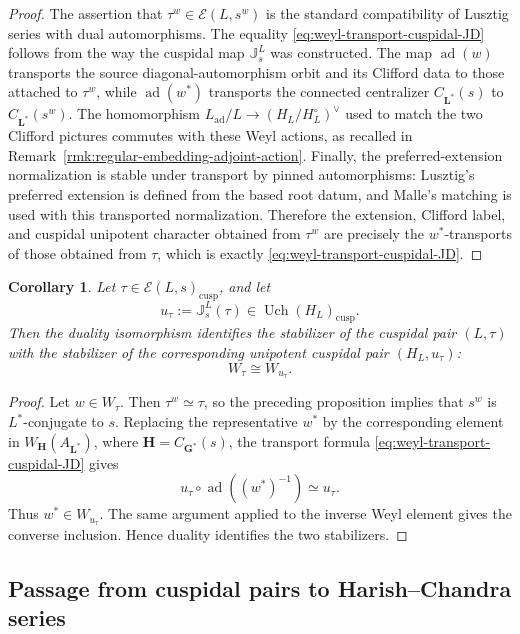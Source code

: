 \documentclass{amsart}
\theoremstyle{plain}
\numberwithin{equation}{section}
\newtheorem{corollary}[theorem]{Corollary}
\theoremstyle{definition}
\newcommand{\cE}{\mathcal{E}}
\newcommand{\Uch}{\operatorname{Uch}}
\newcommand{\J}{\mathbb{J}}
\newcommand{\ad}{\operatorname{ad}}
\newcommand{\cusp}{\operatorname{cusp}}
\newcommand{\bG}{\mathbf{G}}
\newcommand{\bL}{\mathbf{L}}
\newcommand{\bH}{\mathbf{H}}
\begin{document}
\begin{proof}
The assertion that \(\tau^w\in\cE(L,s^w)\) is the standard compatibility of
Lusztig series with dual automorphisms.  The equality
\eqref{eq:weyl-transport-cuspidal-JD} follows from the way the cuspidal map
\(\J_s^L\) was constructed.  The map \(\ad(w)\) transports the source
diagonal-automorphism orbit and its Clifford data to those attached to
\(\tau^w\), while \(\ad(w^*)\) transports the connected centralizer
\(C_{\bL^*}(s)\) to \(C_{\bL^*}(s^w)\).  The homomorphism
\(L_{\ad}/L\to (H_L/H_L^\circ)^\vee\) used to match the two Clifford pictures
commutes with these Weyl actions, as recalled in
Remark~\ref{rmk:regular-embedding-adjoint-action}.  Finally, the
preferred-extension normalization is stable under transport by pinned
automorphisms: Lusztig's preferred extension is defined from the based root
datum, and Malle's matching is used with this transported normalization.
Therefore the extension, Clifford label, and cuspidal unipotent character
obtained from \(\tau^w\) are precisely the \(w^*\)-transports of those obtained
from \(\tau\), which is exactly \eqref{eq:weyl-transport-cuspidal-JD}.
\end{proof}

\begin{corollary}\label{coro:isoweylgp}
Let \(\tau\in \cE(L,s)_{\cusp}\), and let
\[
        u_\tau:=\J_s^L(\tau)\in \Uch(H_L)_{\cusp}.
\]
Then the duality isomorphism identifies the stabilizer of the cuspidal pair
\((L,\tau)\) with the stabilizer of the corresponding unipotent cuspidal pair
\((H_L,u_\tau)\):
\[
        W_{\tau}\cong W_{u_\tau}.
\]
\end{corollary}

\begin{proof}
Let \(w\in W_\tau\).  Then \(\tau^w\simeq\tau\), so the preceding proposition
implies that \(s^w\) is \(L^*\)-conjugate to \(s\).  Replacing the representative
\(w^*\) by the corresponding element in \(W_{\bH}(A_{\bL^*})\), where
\(\bH=C_{\bG^*}(s)\), the transport formula
\eqref{eq:weyl-transport-cuspidal-JD} gives
\[
        u_\tau\circ\ad((w^*)^{-1})\simeq u_\tau.
\]
Thus \(w^*\in W_{u_\tau}\).  The same argument applied to the inverse Weyl
element gives the converse inclusion.  Hence duality identifies the two
stabilizers.
\end{proof}
\subsection{Passage from cuspidal pairs to Harish--Chandra series}
\label{subsec:passage-cusp-to-HC}
\end{document}
